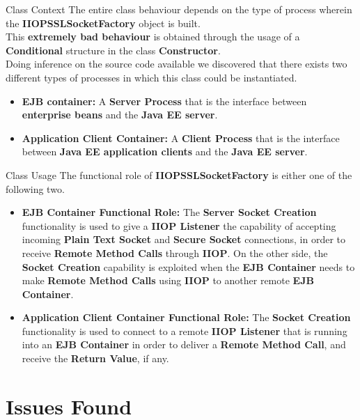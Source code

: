 \documentclass{../common/latex_classes/pdf_presentation}
\begin{document}
		\begin{frame}{Class Context}
			The entire class behaviour depends on the type of process wherein the \textbf{IIOPSSLSocketFactory} object is built.\\
			This \textbf{extremely bad behaviour} is obtained through the usage of a \textbf{Conditional} structure in the class \textbf{Constructor}.\\
			Doing inference on the source code available we discovered that there exists two different types of processes in which this class could be instantiated.
			\begin{itemize}
				\item \textbf{EJB container:}
					A \textbf{Server Process} that is the interface between \textbf{enterprise beans} and the \textbf{Java EE server}.
				\item \textbf{Application Client Container:}
					A \textbf{Client Process} that is the interface between \textbf{Java EE application clients} and the \textbf{Java EE server}.
			\end{itemize}			
		\end{frame}
			
		\begin{frame}{Class Usage}
			The functional role of \textbf{IIOPSSLSocketFactory} is either one of the following two.
			\begin{itemize}
				\item \textbf{EJB Container Functional Role:}
					The \textbf{Server Socket Creation} functionality is used to give a \textbf{IIOP Listener} the capability of accepting incoming \textbf{Plain Text Socket} and \textbf{Secure Socket} connections, in order to receive \textbf{Remote Method Calls} through \textbf{IIOP}.
					On the other side, the \textbf{Socket Creation} capability is exploited when the \textbf{EJB Container} needs to make \textbf{Remote Method Calls} using \textbf{IIOP} to another remote \textbf{EJB Container}.
				\item \textbf{Application Client Container Functional Role:}
					The \textbf{Socket Creation} functionality is used to connect to a remote \textbf{IIOP Listener} that is running into an \textbf{EJB Container} in order to deliver a \textbf{Remote Method Call}, and receive the \textbf{Return Value}, if any.
			\end{itemize}
		\end{frame}
	
	\section{Issues Found}
	
\end{document}
